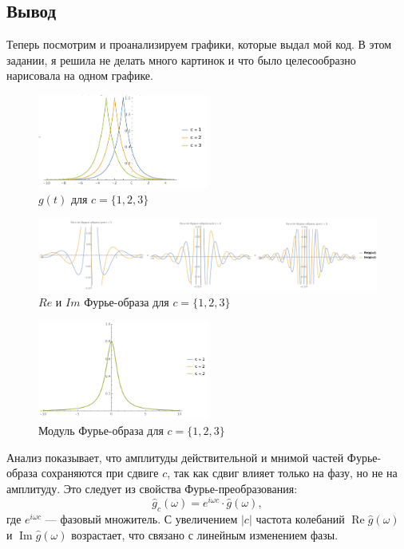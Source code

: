 \documentclass[a4paper,12pt]{article}
\begin{document}
\subsection{Вывод}
Теперь посмотрим и проанализируем графики, которые выдал мой код. В этом задании, я решила не делать много картинок и что было целесообразно нарисовала на одном графике.
\begin{figure}[H]
    \centering
    \includegraphics[width=0.5\textwidth]{images/g(t).png}
    \caption{\( g(t)\) для \( c = \{1, 2, 3\} \)} %
    \label{fig:g_t}
\end{figure}

\begin{figure}[H]
    \centering
    \includegraphics[width=1.1\textwidth]{images/ReIm.png}
    \caption{\( Re \) и \( Im \) Фурье-образа для \( c = \{1, 2, 3\} \)} %
    \label{fig:ReIm}
\end{figure}

\begin{figure}[H]
    \centering
    \includegraphics[width=0.5\textwidth]{images/Abs.png}
    \caption{Модуль Фурье-образа для \( c = \{1, 2, 3\} \)} %
    \label{fig:Abs}
\end{figure}

Анализ показывает, что амплитуды действительной и мнимой частей Фурье-образа сохраняются при сдвиге \( c \), так как сдвиг влияет только на фазу, но не на амплитуду. Это следует из свойства Фурье-преобразования:
\[
\hat{g}_c(\omega) = e^{i \omega c} \cdot \hat{g}(\omega),
\]
где \( e^{i \omega c} \) — фазовый множитель. С увеличением \( |c| \) частота колебаний \(\operatorname{Re} \hat{g}(\omega)\) и \(\operatorname{Im} \hat{g}(\omega)\) возрастает, что связано с линейным изменением фазы.
\end{document}

